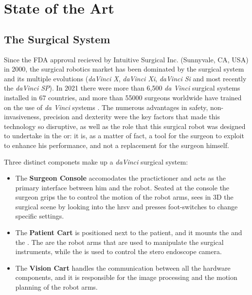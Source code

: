 \documentclass[../main.tex]{subfiles}
\begin{document}
\chapter{State of the Art}

\section{The \davinci Surgical System}
Since the FDA approval recieved by Intuitive Surgical Inc. (Sunnyvale, CA, USA) in 2000, the surgical robotics market has been dominated by the \davinci surgical system and its multiple evolutions (\textit{daVinci X}, \textit{daVinci Xi}, \textit{daVinci Si} and most recently the \textit{daVinci SP}). In 2021 there were more than 6,500 \textit{da Vinci} surgical systems installed in 67 countries, and more than 55000 surgeons worldwide have trained on the use of \textit{da Vinci} systems \cite{Intuitive2021}. The numerous advantages in safety, non-invasiveness, precision and dexterity were the key factors that made this technology so disruptive, as well as the role that this surgical robot was designed to undertake in the \ac{or}: it is, as a matter of fact, a tool for the surgeon to exploit to enhance his performance, and not a replacement for the surgeon himself.

Three distinct componets make up a \textit{daVinci} surgical system:
\begin{itemize}
    \item The \textbf{Surgeon Console} accomodates the practictioner and acts as the primary interface between him and the robot. Seated at the console the surgeon grips the \mtms to control the motion of the robot arms, sees in 3D the surgical scene by looking into the \ac{hrsv} and presses foot-switches to change specific settings.
    \item The \textbf{Patient Cart} is positioned next to the patient, and it mounts the \psms and the \ecm. The \psms are the robot arms that are used to manipulate the surgical instruments, while the \ecm is used to control the stero endoscope camera.
    \item The \textbf{Vision Cart} handles the communication between all the hardware components, and it is responsible for the image processing and the motion planning of the robot arms.
\end{itemize}
\end{document}
